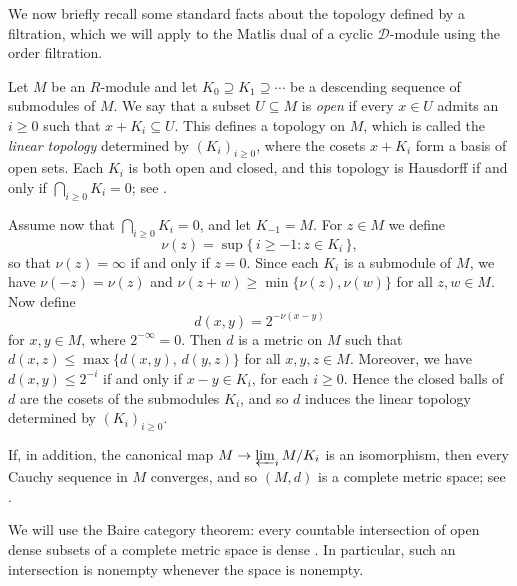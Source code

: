 \documentclass[11pt]{amsart}
\theoremstyle{definition}
\newcommand{\D}{\mathcal D}
\begin{document}
We now briefly recall some standard facts about the topology defined by a filtration, which we will apply to the Matlis dual of a cyclic $\D$-module using the order filtration.

Let $M$ be an $R$-module and let $K_0\supseteq K_1\supseteq\cdots$ be a descending sequence of submodules of $M$. We say that a subset $U\subseteq M$ is \emph{open} if every $x\in U$ admits an $i\ge 0$ such that $x+K_i\subseteq U$. This defines a topology on $M$, which is called the \emph{linear topology} determined by $(K_i)_{i\ge 0}$, where the cosets $x+K_i$ form a basis of open sets. Each $K_i$ is both open and closed, and this topology is Hausdorff if and only if $\bigcap_{i\ge 0}K_i=0$; see \cite[\S 8]{MatCRT}.

Assume now that $\bigcap_{i\ge 0}K_i=0$, and let $K_{-1}=M$. For $z\in M$
we define
\[
  \nu(z)=\sup\{\,i\ge -1 : z\in K_i\,\},
\]
so that $\nu(z)=\infty$ if and only if $z=0$. Since each $K_i$ is a submodule of $M$, we have $\nu(-z)=\nu(z)$ and $\nu(z+w)\ge\min\{\nu(z),\nu(w)\}$ for all $z,w\in M$. Now define
\[
  d(x,y)=2^{-\nu(x-y)}
\]
for $x,y\in M$, where $2^{-\infty}=0$. Then $d$ is a metric on $M$ such that $d(x,z)\le\max\{d(x,y),\,d(y,z)\}$ for all $x,y,z\in M$. Moreover, we have $d(x,y)\le 2^{-i}$ if and only if $x-y\in K_i$, for each $i\ge 0$. Hence the closed balls of $d$ are the cosets of the submodules $K_i$, and so $d$
induces the linear topology determined by $(K_i)_{i\ge 0}$.

If, in addition, the canonical map $M\to\varprojlim_i M/K_i$ is an isomorphism, then every Cauchy sequence in $M$ converges, and so $(M,d)$ is a complete metric space; see \cite[pp.~102--105]{AM}.

We will use the Baire category theorem: every countable intersection of open dense subsets of a complete metric space is dense \cite[Theorem~48.2]{Munkres}. In particular, such an intersection is nonempty whenever the space is nonempty.
\end{document}
